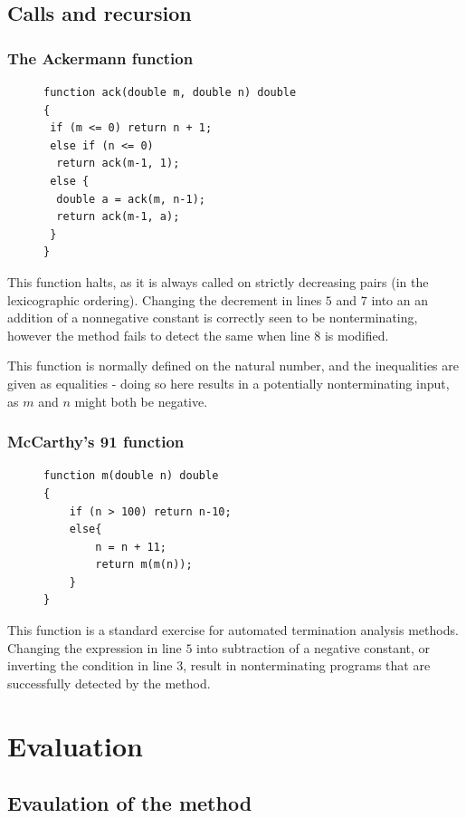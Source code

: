 \documentclass[12pt,a4paper]{article}
\begin{document}
\subsection{Calls and recursion}
\subsubsection{The Ackermann function}\label{example:ack}
\begin{figure}
\centering
\begin{lstlisting}[frame=tlrb,language=myLang]
function ack(double m, double n) double
{
 if (m <= 0) return n + 1;
 else if (n <= 0) 
  return ack(m-1, 1);
 else {
  double a = ack(m, n-1);
  return ack(m-1, a);
 }
}
\end{lstlisting}
\end{figure}
This function halts, as it is always called on strictly decreasing pairs (in the lexicographic ordering).
Changing the decrement in lines $5$ and $7$ into an an addition of a nonnegative constant is correctly seen to be nonterminating,
however the method fails to detect the same when line $8$ is modified.

This function is normally defined on the natural number, and the inequalities are given as equalities - doing so here results in a potentially
nonterminating input, as $m$ and $n$ might both be negative.

\subsubsection{McCarthy's 91 function}
\begin{figure}
\centering
\begin{lstlisting}[frame=tlrb,language=myLang]
function m(double n) double
{
    if (n > 100) return n-10;
    else{
        n = n + 11;
        return m(m(n));
    }
}
\end{lstlisting}
\end{figure}
This function is a standard exercise for automated termination analysis methods. Changing the expression in line $5$ into subtraction of a negative constant,
or inverting the condition in line $3$, result in nonterminating programs that are successfully detected by the method.
\pagebreak
\section{Evaluation}
\subsection{Evaulation of the method}
\end{document}
